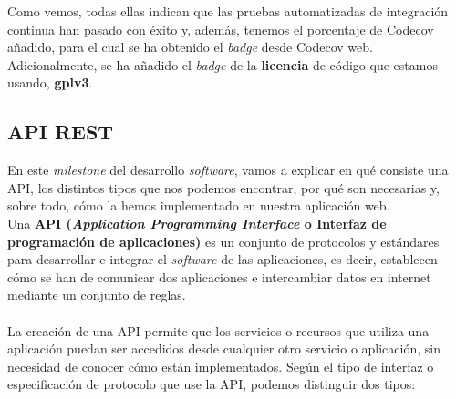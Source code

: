 Como vemos, todas ellas indican que las pruebas automatizadas de integración continua han
pasado con éxito y, además, tenemos el porcentaje de Codecov añadido, para el cual se ha
obtenido el \textit{badge} desde Codecov web. Adicionalmente, se ha añadido el
\textit{badge} de la \textbf{licencia} de código que estamos usando, \textbf{gplv3}.

\subsection{API REST}
En este \textit{milestone} del desarrollo \textit{software}, vamos a explicar en qué
consiste una API, los distintos tipos que nos podemos encontrar, por qué son necesarias y,
sobre todo, cómo la hemos implementado en nuestra aplicación web.\\

Una \textbf{API \cite{api} (\textit{Application Programming Interface} o Interfaz de
programación de aplicaciones)} es un conjunto de protocolos y estándares para desarrollar e
integrar el \textit{software} de las aplicaciones, es decir, establecen cómo se han de
comunicar dos aplicaciones e intercambiar datos en internet mediante un conjunto de reglas.\\ \\

La creación de una API permite que los servicios o recursos que utiliza una aplicación
puedan ser accedidos desde cualquier otro servicio o aplicación, sin necesidad de
conocer cómo están implementados. Según el tipo de interfaz o especificación de protocolo
que use la API, podemos distinguir dos tipos:


